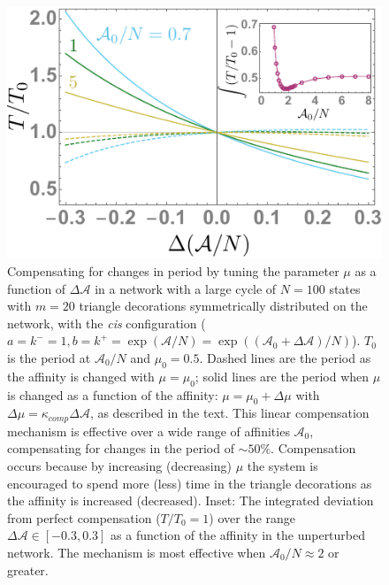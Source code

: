\documentclass[amsmath, preprintnumbers, 10pt, twocolumn, pre, bibliograpy]{revtex4-1}
\newcommand{\aff}{\mathcal A}
\providecommand{\DIFaddbeginFL}{} %
\providecommand{\DIFaddendFL}{} %
\newcommand{\DIFaddincludegraphics}[2][]{{\color{blue}\fbox{\DIFOincludegraphics[#1]{#2}}}} %
\DeclareRobustCommand{\DIFaddbeginFL}{\DIFOaddbeginFL \let\includegraphics\DIFaddincludegraphics} %
\DeclareRobustCommand{\DIFaddendFL}{\DIFOaddendFL \let\includegraphics\DIFOincludegraphics} %
\begin{document}
\begin{figure}
\centering
\includegraphics[width=0.9\linewidth]{fig-6}
 \caption{Compensating for changes in period by tuning the parameter $\mu$ as a function of $\Delta\aff$ in a network with a large cycle of $N = 100$ states with $m = 20$ triangle decorations symmetrically distributed on the network, with the \DIFaddbeginFL {\it \DIFaddendFL cis\DIFaddbeginFL } \DIFaddendFL configuration ($a = k^- = 1, b = k^+ = \exp(\aff/N) = \exp((\aff_0 + \Delta\aff)/N)$). $T_0$ is the period at $\aff_0/N$ and $\mu_0 = 0.5$. Dashed lines are the period as the affinity is changed with $\mu = \mu_0$; solid lines are the period when $\mu$ is changed as a function of the affinity: $\mu =\mu_0 + \Delta\mu$ with $\Delta\mu = \kappa_{comp}\Delta\aff$, as described in the text. This linear compensation mechanism is effective over a wide range of affinities $\aff_0$, compensating for changes in the period of $\sim 50\%$. Compensation occurs because by increasing (decreasing) $\mu$ the system is encouraged to spend more (less) time in the triangle decorations as the affinity is increased (decreased). Inset: The integrated deviation from perfect compensation ($T/T_0 = 1$) over the range $\Delta\aff \in [-0.3, 0.3]$ as a function of the affinity in the unperturbed network.  The mechanism is most effective when $\aff_0/N \approx 2$ or greater.}
\label{fig:compensation}
\end{figure}

\end{document}
